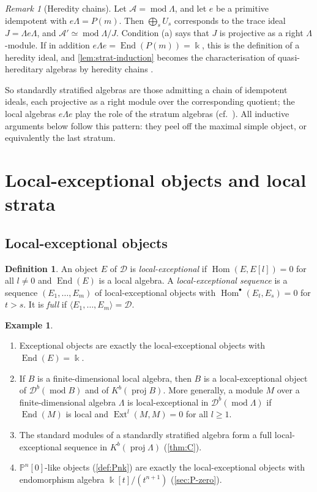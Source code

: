 \documentclass[11pt,reqno]{amsart}
\theoremstyle{plain}
\theoremstyle{definition}
\newtheorem{definition}[theorem]{Definition}
\newtheorem{example}[theorem]{Example}
\theoremstyle{remark}
\newtheorem{remark}[theorem]{Remark}
\newcommand{\kk}{\Bbbk}
\DeclareMathOperator{\Hom}{Hom}
\DeclareMathOperator{\End}{End}
\DeclareMathOperator{\Ext}{Ext}
\newcommand{\modd}{\operatorname{mod}}
\newcommand{\proj}{\operatorname{proj}}
\newcommand{\Db}{\mathcal{D}^b}
\newcommand{\Kb}{K^b}
\newcommand{\thick}[1]{\langle #1\rangle}
\newcommand{\Pn}[2]{\mathbb{P}^{#1}[#2]}
\newcommand{\cD}{\mathcal{D}}
\newcommand{\cA}{\mathcal{A}}
\begin{document}
\begin{remark}[Heredity chains]\label{rem:heredity}
Let $\cA=\modd\Lambda$, and let $e$ be a primitive idempotent with $e\Lambda=P(m)$. Then $\bigoplus_sU_s$ corresponds to the trace ideal $J=\Lambda e\Lambda$, and $\cA'\simeq\modd\Lambda/J$. Condition (a) says that $J$ is projective as a right $\Lambda$-module. If in addition $e\Lambda e=\End(P(m))=\kk$, this is the definition of a heredity ideal, and \cref{lem:strat-induction} becomes the characterisation of quasi-hereditary algebras by heredity chains \cite{CPS88,DR92}.

So standardly stratified algebras are those admitting a chain of idempotent ideals, each projective as a right module over the corresponding quotient; the local algebras $e\Lambda e$ play the role of the stratum algebras (cf.\ \cite{Dla96,CPS96}). All inductive arguments below follow this pattern: they peel off the maximal simple object, or equivalently the last stratum.
\end{remark}



\section{Local-exceptional objects and local strata}\label{sec:local}

\subsection{Local-exceptional objects}

\begin{definition}\label{def:local-exc}
An object $E$ of $\cD$ is \emph{local-exceptional} if $\Hom(E,E[l])=0$ for all $l\ne0$ and $\End(E)$ is a local algebra. A \emph{local-exceptional sequence} is a sequence $(E_1,\dots,E_m)$ of local-exceptional objects with $\Hom^\bullet(E_t,E_s)=0$ for $t>s$. It is \emph{full} if $\thick{E_1,\dots,E_m}=\cD$.
\end{definition}

\begin{example}\label{ex:local-exc}
\leavevmode
\begin{enumerate}
\item Exceptional objects are exactly the local-exceptional objects with $\End(E)=\kk$.
\item If $B$ is a finite-dimensional local algebra, then $B$ is a local-exceptional object of $\Db(\modd B)$ and of $\Kb(\proj B)$. More generally, a module $M$ over a finite-dimensional algebra $\Lambda$ is local-exceptional in $\Db(\modd\Lambda)$ if $\End(M)$ is local and $\Ext^l(M,M)=0$ for all $l\ge1$.
\item The standard modules of a standardly stratified algebra form a full local-exceptional sequence in $\Kb(\proj\Lambda)$ (\cref{thm:C}).
\item $\Pn n0$-like objects (\cref{def:Pnk}) are exactly the local-exceptional objects with endomorphism algebra $\kk[t]/(t^{n+1})$ (\cref{sec:P-zero}).
\end{enumerate}
\end{example}
\end{document}
